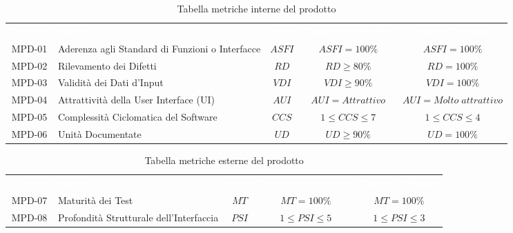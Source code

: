 \renewcommand{\arraystretch}{1.5}
\begin{longtable}{ c C{4cm} c c c}
\caption{Tabella metriche interne del prodotto}\\
\textcolor{white}{\textbf{Metrica}} & \textcolor{white}{\textbf{Nome}} & \textcolor{white}{\textbf{Sigla}} & \textcolor{white}{\textbf{Valore Accettabile}} & \textcolor{white}{\textbf{Valore Ottimale}}\\
    MPD-01 & Aderenza agli Standard di Funzioni o Interfacce & $ASFI$ & $ASFI = 100\%$ & $ASFI = 100\%$\\
    MPD-02 & Rilevamento dei Difetti & $RD$ & $ RD \geq 80\% $ & $RD = 100\%$\\
    MPD-03 & Validità dei Dati d'Input & $VDI$ &  $VDI \geq 90\%$ &  $VDI = 100\%$\\
    MPD-04 & Attrattività della User Interface (UI) & $AUI$ & $AUI = Attrattivo$ &  $AUI = Molto \; attrattivo$\\
    MPD-05 & Complessità Ciclomatica del Software & $CCS $ & $1 \leq CCS \leq 7 $ & $1 \leq CCS \leq 4$\\
    MPD-06 & Unità Documentate & $UD$ & $UD \geq 90\%$ & $UD = 100\%$\\
\end{longtable} 

\newpage %

\renewcommand{\arraystretch}{1.5}
\begin{longtable}{ c C{4cm} c c c}
\caption{Tabella metriche esterne del prodotto}\\
\textcolor{white}{\textbf{Metrica}} & \textcolor{white}{\textbf{Nome}} & \textcolor{white}{\textbf{Sigla}} & \textcolor{white}{\textbf{Valore Accettabile}} & \textcolor{white}{\textbf{Valore Ottimale}}\\
    MPD-07 & Maturità dei Test & $MT$ & $MT = 100\%$ & $MT = 100\%$\\
    MPD-08 & Profondità Strutturale dell'Interfaccia & $PSI$ & $1 \leq PSI \leq 5$ &$1 \leq PSI \leq 3$\\
\end{longtable}